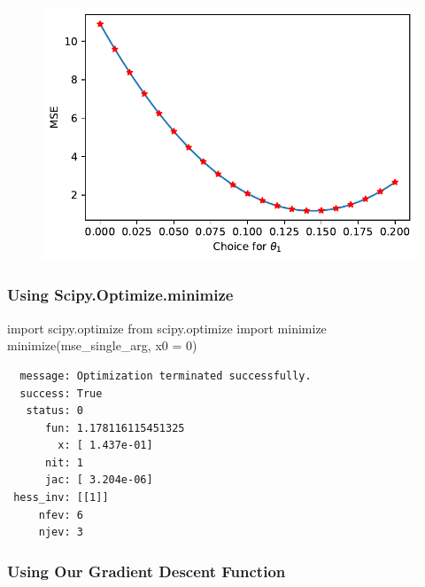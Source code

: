 \documentclass[
  letterpaper,
  DIV=11,
  numbers=noendperiod]{scrreprt}
\newenvironment{Shaded}{\begin{snugshade}}{\end{snugshade}}
\newcommand{\DecValTok}[1]{\textcolor[rgb]{0.68,0.00,0.00}{#1}}
\newcommand{\ImportTok}[1]{\textcolor[rgb]{0.00,0.46,0.62}{#1}}
\newcommand{\NormalTok}[1]{\textcolor[rgb]{0.00,0.23,0.31}{#1}}
\newcommand{\OperatorTok}[1]{\textcolor[rgb]{0.37,0.37,0.37}{#1}}
\begin{document}
\begin{figure}[H]

{\centering \includegraphics{gradient_descent/gradient_descent_files/figure-pdf/cell-29-output-1.pdf}

}

\end{figure}

\hypertarget{using-scipy.optimize.minimize}{%
\subsubsection{Using
Scipy.Optimize.minimize}\label{using-scipy.optimize.minimize}}

\begin{Shaded}
\begin{Highlighting}[]
\ImportTok{import}\NormalTok{ scipy.optimize}
\ImportTok{from}\NormalTok{ scipy.optimize }\ImportTok{import}\NormalTok{ minimize}
\NormalTok{minimize(mse\_single\_arg, x0 }\OperatorTok{=} \DecValTok{0}\NormalTok{)}
\end{Highlighting}
\end{Shaded}

\begin{verbatim}
  message: Optimization terminated successfully.
  success: True
   status: 0
      fun: 1.178116115451325
        x: [ 1.437e-01]
      nit: 1
      jac: [ 3.204e-06]
 hess_inv: [[1]]
     nfev: 6
     njev: 3
\end{verbatim}

\hypertarget{using-our-gradient-descent-function}{%
\subsubsection{Using Our Gradient Descent
Function}\label{using-our-gradient-descent-function}}
\end{document}
